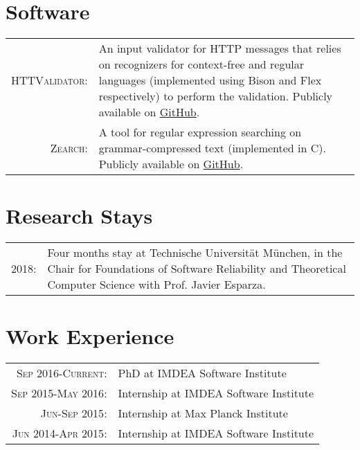 \documentclass[a4paper,10pt]{article} %
\begin{document}
\section{Software}

\begin{tabular}{rp{11cm}}
\textsc{HTTValidator}: & An input validator for HTTP messages that relies on recognizers for context-free and regular languages (implemented using Bison and Flex respectively) to perform the validation. Publicly available on \href{https://github.com/pevalme/HTTPValidator}{GitHub}. \\

\textsc{Zearch}: & A tool for regular expression searching on grammar-compressed text (implemented in C). Publicly available on \href{https://github.com/pevalme/zearch}{GitHub}.\\
\end{tabular}


\section{Research Stays}

\begin{tabular}{rp{13cm}}
\textsc{2018}: & Four months stay at Technische Universität München, in the Chair for Foundations of Software Reliability and Theoretical Computer Science with Prof. Javier Esparza. 
\end{tabular}


\section{Work Experience}

\begin{tabular}{rp{11cm}}
\textsc{Sep 2016-Current}: & PhD at IMDEA Software Institute\\

\textsc{Sep 2015-May 2016}: & Internship at IMDEA Software Institute\\

\textsc{Jun-Sep 2015}: & Internship at Max Planck Institute\\

\textsc{Jun 2014-Apr 2015}: & Internship at IMDEA Software Institute\\
\end{tabular}
\end{document}
